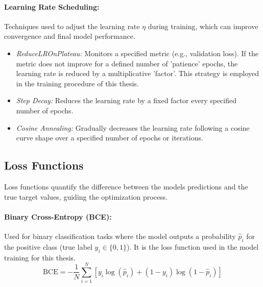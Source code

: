 \begin{appendices}
  \paragraph{Learning Rate Scheduling:}
  Techniques used to adjust the learning rate \( \eta \) during training, which can improve convergence and final model performance.
  \begin{itemize}
    \item \textit{ReduceLROnPlateau:} Monitors a specified metric (e.g., validation loss). If the metric does not improve for a defined number of 'patience' epochs, the learning rate is reduced by a multiplicative 'factor'. This strategy is employed in the training procedure of this thesis.
    \item \textit{Step Decay:} Reduces the learning rate by a fixed factor every specified number of epochs.
    \item \textit{Cosine Annealing:} Gradually decreases the learning rate following a cosine curve shape over a specified number of epochs or iterations.
  \end{itemize}

  \subsection{Loss Functions}
  Loss functions quantify the difference between the models predictions and the true target values, guiding the optimization process.

  \paragraph{Binary Cross-Entropy (BCE):}
  \label{eq:bce} %
  Used for binary classification tasks where the model outputs a probability \( \hat{p}_i \) for the positive class (true label \( y_i \in \{0, 1\} \)). It is the loss function used in the model training for this thesis.
  \begin{equation}
    \text{BCE} = -\frac{1}{N} \sum_{i=1}^N [ y_i \log(\hat{p}_i) + (1 - y_i) \log(1 - \hat{p}_i) ]
  \end{equation}



\end{appendices}
